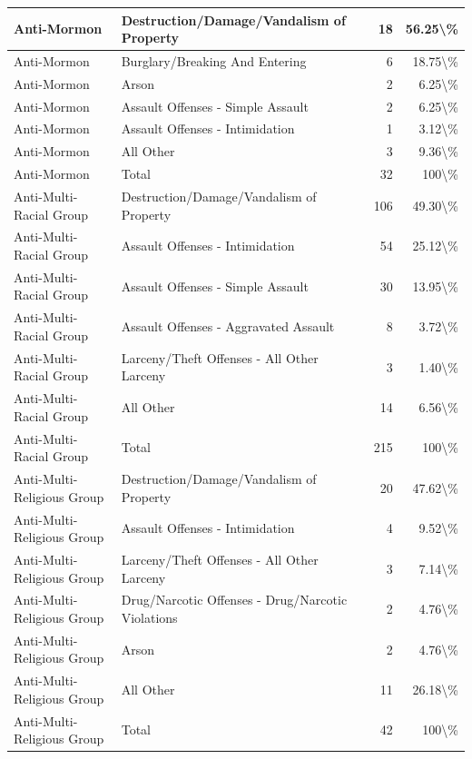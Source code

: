 \documentclass[
]{krantz}
\begin{document}
\begin{longtable}[t]{l|l|r|r}
\hline
Anti-Mormon & Destruction/Damage/Vandalism of Property & 18 & 56.25\textbackslash{}\%\\
\hline
Anti-Mormon & Burglary/Breaking And Entering & 6 & 18.75\textbackslash{}\%\\
\hline
Anti-Mormon & Arson & 2 & 6.25\textbackslash{}\%\\
\hline
Anti-Mormon & Assault Offenses - Simple Assault & 2 & 6.25\textbackslash{}\%\\
\hline
Anti-Mormon & Assault Offenses - Intimidation & 1 & 3.12\textbackslash{}\%\\
\hline
Anti-Mormon & All Other & 3 & 9.36\textbackslash{}\%\\
\hline
Anti-Mormon & Total & 32 & 100\textbackslash{}\%\\
\hline
Anti-Multi-Racial Group & Destruction/Damage/Vandalism of Property & 106 & 49.30\textbackslash{}\%\\
\hline
Anti-Multi-Racial Group & Assault Offenses - Intimidation & 54 & 25.12\textbackslash{}\%\\
\hline
Anti-Multi-Racial Group & Assault Offenses - Simple Assault & 30 & 13.95\textbackslash{}\%\\
\hline
Anti-Multi-Racial Group & Assault Offenses - Aggravated Assault & 8 & 3.72\textbackslash{}\%\\
\hline
Anti-Multi-Racial Group & Larceny/Theft Offenses - All Other Larceny & 3 & 1.40\textbackslash{}\%\\
\hline
Anti-Multi-Racial Group & All Other & 14 & 6.56\textbackslash{}\%\\
\hline
Anti-Multi-Racial Group & Total & 215 & 100\textbackslash{}\%\\
\hline
Anti-Multi-Religious Group & Destruction/Damage/Vandalism of Property & 20 & 47.62\textbackslash{}\%\\
\hline
Anti-Multi-Religious Group & Assault Offenses - Intimidation & 4 & 9.52\textbackslash{}\%\\
\hline
Anti-Multi-Religious Group & Larceny/Theft Offenses - All Other Larceny & 3 & 7.14\textbackslash{}\%\\
\hline
Anti-Multi-Religious Group & Drug/Narcotic Offenses - Drug/Narcotic Violations & 2 & 4.76\textbackslash{}\%\\
\hline
Anti-Multi-Religious Group & Arson & 2 & 4.76\textbackslash{}\%\\
\hline
Anti-Multi-Religious Group & All Other & 11 & 26.18\textbackslash{}\%\\
\hline
Anti-Multi-Religious Group & Total & 42 & 100\textbackslash{}\%\\

\end{longtable}
\end{document}
